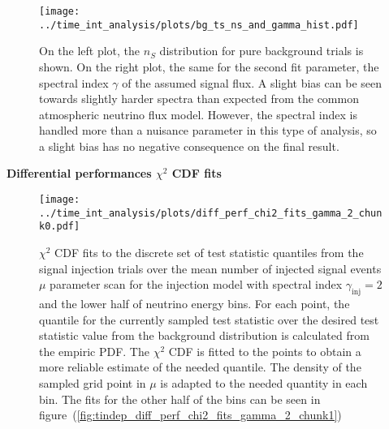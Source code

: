 \begin{figure}[H]
  \centering
  \texttt{[image: ../time\_int\_analysis/plots/bg\_ts\_ns\_and\_gamma\_hist.pdf]}
  \caption[Signal strength and spectral index distribution for background trials]{
    On the left plot, the $n_S$ distribution for pure background trials is shown.
    On the right plot, the same for the second fit parameter, the spectral index $\gamma$ of the assumed signal flux.
    A slight bias can be seen towards slightly harder spectra than expected from the common atmospheric neutrino flux model.
    However, the spectral index is handled more than a nuisance parameter in this type of analysis, so a slight bias has no negative consequence on the final result.
  }
  \label{fig:bg_ts_ns_and_gamma_hist}
\end{figure}

\newpage
\textbf{\Large\sffamily Differential performances $\chi^2$ CDF fits}
\enlargethispage*{5cm}
\begin{figure}[H]
  \centering
  \texttt{[image: ../time\_int\_analysis/plots/diff\_perf\_chi2\_fits\_gamma\_2\_chunk0.pdf]}
  \caption[$\chi^2$ CDF fits for the time-integrated diff. performance, $\gamma_\text{inj}=2$ -- part 1]{
     $\chi^2$ CDF fits to the discrete set of test statistic quantiles from the signal injection trials over the mean number of injected signal events $\mu$ parameter scan for the injection model with spectral index $\gamma_\text{inj}=2$ and the lower half of neutrino energy bins.
     For each point, the quantile for the currently sampled test statistic over the desired test statistic value from the background distribution is calculated from the empiric PDF.
     The $\chi^2$ CDF is fitted to the points to obtain a more reliable estimate of the needed quantile.
     The density of the sampled grid point in $\mu$ is adapted to the needed quantity in each bin.
     The fits for the other half of the bins can be seen in figure~(\ref{fig:tindep_diff_perf_chi2_fits_gamma_2_chunk1})
  }
  \label{fig:tindep_diff_perf_chi2_fits_gamma_2_chunk0}
\end{figure}

